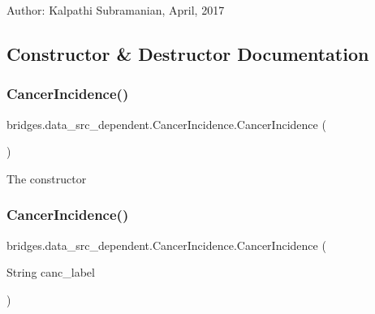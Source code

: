 Author\+: Kalpathi Subramanian, April, 2017 

\subsection{Constructor \& Destructor Documentation}
\hypertarget{classbridges_1_1data__src__dependent_1_1_cancer_incidence_a92db1eb4292c77f07619019587caf5cc}{}\label{classbridges_1_1data__src__dependent_1_1_cancer_incidence_a92db1eb4292c77f07619019587caf5cc} 
\subsubsection{\texorpdfstring{Cancer\+Incidence()}{CancerIncidence()}\hspace{0.1cm}{\footnotesize\ttfamily [1/2]}}
{\footnotesize\ttfamily bridges.\+data\+\_\+src\+\_\+dependent.\+Cancer\+Incidence.\+Cancer\+Incidence (\begin{DoxyParamCaption}{ }\end{DoxyParamCaption})}

The constructor \hypertarget{classbridges_1_1data__src__dependent_1_1_cancer_incidence_a3db553c2769892563c3f1ebb033ba4c6}{}\label{classbridges_1_1data__src__dependent_1_1_cancer_incidence_a3db553c2769892563c3f1ebb033ba4c6} 
\subsubsection{\texorpdfstring{Cancer\+Incidence()}{CancerIncidence()}\hspace{0.1cm}{\footnotesize\ttfamily [2/2]}}
{\footnotesize\ttfamily bridges.\+data\+\_\+src\+\_\+dependent.\+Cancer\+Incidence.\+Cancer\+Incidence (\begin{DoxyParamCaption}\item[{String}]{canc\+\_\+label }\end{DoxyParamCaption})}



